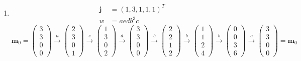 \documentclass[a4paper]{scrartcl}
\begin{document}
\begin{enumerate}
    \item
        \begin{align}
            \textbf{j} &= \left( 1, 3, 1, 1, 1 \right)^T \\
            w &= aedb^3c
        \end{align}
        \begin{equation}
            \textbf{m}_0 =
            \begin{pmatrix}
                3 \\ 3 \\ 0 \\ 0
            \end{pmatrix}
            \stackrel{a}{\to}
            \begin{pmatrix}
                2 \\ 3 \\ 0 \\ 1
            \end{pmatrix}
            \stackrel{e}{\to}
            \begin{pmatrix}
                1 \\ 3 \\ 0 \\ 2
            \end{pmatrix}
            \stackrel{d}{\to}
            \begin{pmatrix}
                3 \\ 3 \\ 0 \\ 0
            \end{pmatrix}
            \stackrel{b}{\to}
            \begin{pmatrix}
                2 \\ 2 \\ 1 \\ 2
            \end{pmatrix}
            \stackrel{b}{\to}
            \begin{pmatrix}
                1 \\ 1 \\ 2 \\ 4
            \end{pmatrix}
            \stackrel{b}{\to}
            \begin{pmatrix}
                0 \\ 0 \\ 3 \\ 6
            \end{pmatrix}
            \stackrel{c}{\to}
            \begin{pmatrix}
                3 \\ 3 \\ 0 \\ 0
            \end{pmatrix}
            = \textbf{m}_0
        \end{equation}

\end{enumerate}
\end{document}
